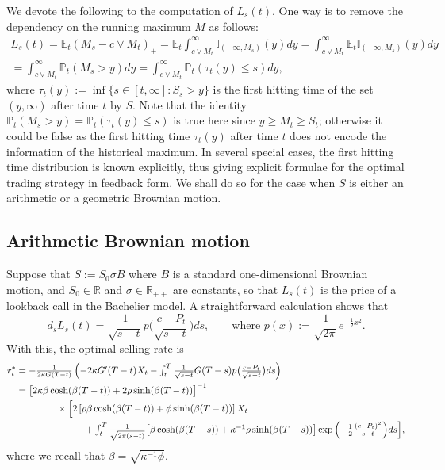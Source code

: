\documentclass[openany,oneside]{article}
\theoremstyle{definition}
\theoremstyle{remark}
\newtheorem{rem}[thm]{Remark}
\newcommand{\E}{\mathbb{E}} %
\renewcommand{\P}{\mathbb{P}} %
\newcommand{\I}{\mathbb{I}} %
\newcommand{\ts}{\textstyle}
\begin{document}

We devote the following to the computation of $L_s(t)$. One way is to remove the dependency on the running maximum $M$ as follows:
\begin{multline*}
\ts L_s(t) = \E_t(M_s-c\vee M_t)_+ = \E_t \int_{c\vee M_t}^{\infty}\I_{(-\infty,M_s)}(y) dy = \int_{c\vee M_t}^\infty \E_t \I_{(-\infty,M_s)}(y)dy \\
 \ts = \int_{c\vee M_t}^\infty \P_t(M_s > y) dy= \int_{c\vee M_t}^\infty \P_t(\tau_t(y) \le s) dy,
\end{multline*}
where $\tau_t(y):=\inf\{s\in[t,\infty] : S_s> y\}$ is the first hitting time of the set $(y,\infty)$ after time $t$ by $S$. Note that the identity $\P_t(M_s > y) = \P_t(\tau_t(y)\le s)$ is true here since $y\ge M_t\ge S_t$; otherwise it could be false as the first hitting time $\tau_t(y)$ after time $t$ does not encode the information of the historical maximum. In several special cases, the first hitting time distribution is known explicitly, thus giving explicit formulae for the optimal trading strategy in feedback form. We shall do so for the case when $S$ is either an arithmetic or a geometric Brownian motion.

\subsection{Arithmetic Brownian motion}
Suppose that $S:=S_0 \sigma B$ where $B$ is a standard one-dimensional Brownian motion, and $S_0\in\mathbb{R}$ and $\sigma\in\mathbb{R}_{++}$ are constants, so that $L_s(t)$ is the price of a lookback call in the Bachelier model. A straightforward calculation shows that
\[
 \ts d_s L_s(t) = \frac{1}{\sqrt{s-t}}p\bigl(\frac{c-P_t}{\sqrt{s-t}}\bigr)ds,\qquad\text{where } p(x):=\frac{1}{\sqrt{2\pi}}e^{-\frac{1}{2}x^2}.
\]
With this, the optimal selling rate is
\begin{align*}
r^\ast_t &\ts= -\frac{1}{2\kappa G(T-t)}\left(-2\kappa G'(T-t) X_t - \int_t^T \frac{1}{\sqrt{s-t}} G(T-s) p\bigl(\frac{c-P_t}{\sqrt{s-t}}\bigr) ds\right) \\
&= \bigl[2\kappa\beta\cosh(\beta (T-t))+2\rho\sinh(\beta (T-t))\bigr]^{-1} \\
&\hspace{1.5cm} \times \Bigl[2\left[\rho\beta\cosh(\beta (T-t))+\phi\sinh(\beta (T-t))\right] X_t\\
&\ts\hspace{2.5cm} + \int_t^T \frac{1}{\sqrt{2\pi(s-t)}}\bigl[\beta\cosh(\beta (T-s))+\kappa^{-1}\rho\sinh(\beta (T-s))\bigr] \exp{\left(-\frac{1}{2}\frac{(c-P_t)^2}{s-t}\right)} ds \Bigr],
\end{align*}
where we recall that $\beta=\sqrt{\kappa^{-1}\phi}$.
\end{document}
